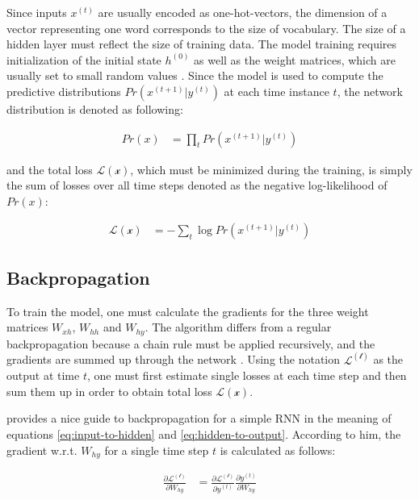 \documentclass[]{krantz}
\begin{document}
Since inputs \(x^{(t)}\) are usually encoded as one-hot-vectors, the dimension of a vector representing one word corresponds to the size of vocabulary. The size of a hidden layer must reflect the size of training data. The model training requires initialization of the initial state \(h^{(0)}\) as well as the weight matrices, which are usually set to small random values \citep{mikolov2010recurrent}. Since the model is used to compute the predictive distributions \(Pr(x^{(t+1)}|y^{(t)})\) at each time instance \(t\), the network distribution is denoted as following:

\begin{align}
Pr(x) & =\prod_{t} Pr(x^{(t+1)}|y^{(t)}) \label{eq:rnn-probability} 
\end{align}

and the total loss \(\mathcal{L(x)}\), which must be minimized during the training, is simply the sum of losses over all time steps denoted as the negative log-likelihood of \(Pr(x)\):

\begin{align}
\mathcal{L(x)} & =-\sum_{t} \log{Pr(x^{(t+1)}|y^{(t)})} \label{eq:rnn-log-loss}   
\end{align}

\citep{graves2013generating}

\hypertarget{backpropagation}{%
\subsection{Backpropagation}\label{backpropagation}}

To train the model, one must calculate the gradients for the three weight matrices \(W_{xh}\), \(W_{hh}\) and \(W_{hy}\). The algorithm differs from a regular backpropagation because a chain rule must be applied recursively, and the gradients are summed up through the network \citep{boden2002guide}. Using the notation \(\mathcal{L^{(t)}}\) as the output at time \(t\), one must first estimate single losses at each time step and then sum them up in order to obtain total loss \(\mathcal{L(x)}\).

\citet{chen2016gentle} provides a nice guide to backpropagation for a simple RNN in the meaning of equations \eqref{eq:input-to-hidden} and \eqref{eq:hidden-to-output}. According to him, the gradient w.r.t. \(W_{hy}\) for a single time step \(t\) is calculated as follows:

\begin{align}
\frac{\partial \mathcal{L^{(t)}}}{\partial W_{hy}} & = \frac{\partial \mathcal{L^{(t)}}}{\partial y^{(t)}} \frac{\partial y^{(t)}}{\partial W_{hy}}\label{eq:rnn-back-hy-one} \\
\end{align}
\end{document}
